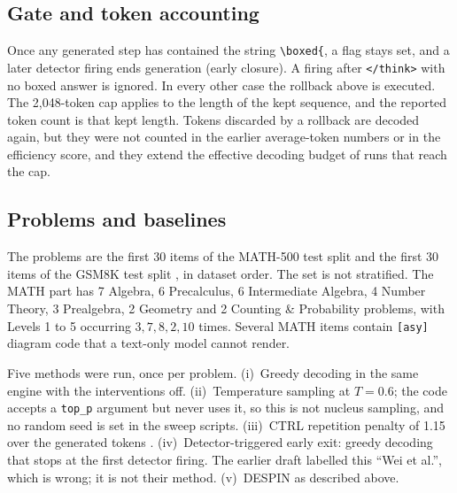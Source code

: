 \documentclass[11pt]{article}
\begin{document}
\subsection{Gate and token accounting}
Once any generated step has contained the string \texttt{\textbackslash boxed\{}, a flag stays set, and a later detector firing ends generation (early closure). A firing after \texttt{</think>} with no boxed answer is ignored. In every other case the rollback above is executed. The 2{,}048-token cap applies to the length of the kept sequence, and the reported token count is that kept length. Tokens discarded by a rollback are decoded again, but they were not counted in the earlier average-token numbers or in the efficiency score, and they extend the effective decoding budget of runs that reach the cap.

\subsection{Problems and baselines}\label{sec:setup}
The problems are the first 30 items of the MATH-500 test split \citep{hendrycks2021math,lightman2023let} and the first 30 items of the GSM8K test split \citep{cobbe2021gsm8k}, in dataset order. The set is not stratified. The MATH part has 7 Algebra, 6 Precalculus, 6 Intermediate Algebra, 4 Number Theory, 3 Prealgebra, 2 Geometry and 2 Counting \& Probability problems, with Levels 1 to 5 occurring $3,7,8,2,10$ times. Several MATH items contain \texttt{[asy]} diagram code that a text-only model cannot render.

Five methods were run, once per problem. (i)~Greedy decoding in the same engine with the interventions off. (ii)~Temperature sampling at $T=0.6$; the code accepts a \texttt{top\_p} argument but never uses it, so this is not nucleus sampling, and no random seed is set in the sweep scripts. (iii)~CTRL repetition penalty of 1.15 over the generated tokens \citep{keskar2019ctrl}. (iv)~Detector-triggered early exit: greedy decoding that stops at the first detector firing. The earlier draft labelled this ``Wei et al.'', which is wrong; it is not their method. (v)~DESPIN as described above.
\end{document}
